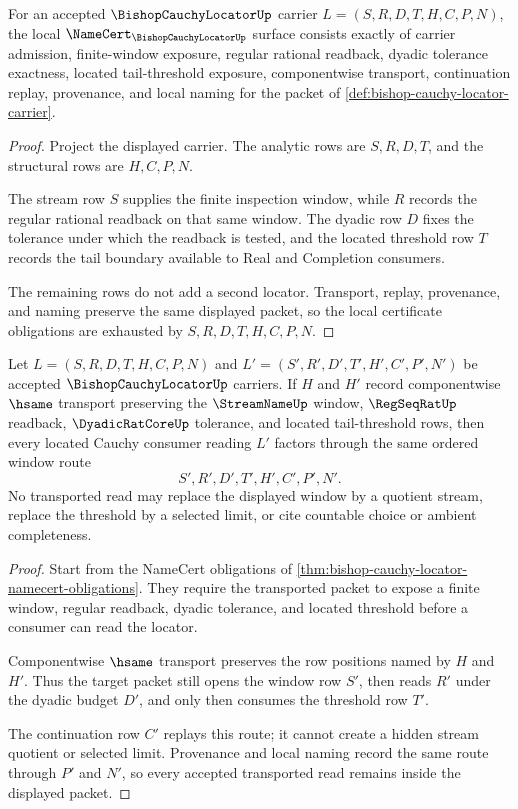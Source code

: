 \begin{theorem}
\label{thm:bishop-cauchy-locator-namecert-obligations}
For an accepted $\BishopCauchyLocatorUp$ carrier $L=(S,R,D,T,H,C,P,N)$, the local $\NameCert_{\BishopCauchyLocatorUp}$ surface consists exactly of carrier admission, finite-window exposure, regular rational readback, dyadic tolerance exactness, located tail-threshold exposure, componentwise transport, continuation replay, provenance, and local naming for the packet of \autoref{def:bishop-cauchy-locator-carrier}.
\end{theorem}
\begin{proof}
Project the displayed carrier. The analytic rows are $S,R,D,T$, and the structural rows are $H,C,P,N$.

The stream row $S$ supplies the finite inspection window, while $R$ records the regular rational readback on that same window. The dyadic row $D$ fixes the tolerance under which the readback is tested, and the located threshold row $T$ records the tail boundary available to Real and Completion consumers.

The remaining rows do not add a second locator. Transport, replay, provenance, and naming preserve the same displayed packet, so the local certificate obligations are exhausted by $S,R,D,T,H,C,P,N$.
\end{proof}

\begin{theorem}
\label{thm:bishop-cauchy-locator-window-stability}
Let $L=(S,R,D,T,H,C,P,N)$ and $L'=(S',R',D',T',H',C',P',N')$ be accepted $\BishopCauchyLocatorUp$ carriers. If $H$ and $H'$ record componentwise $\hsame$ transport preserving the $\StreamNameUp$ window, $\RegSeqRatUp$ readback, $\DyadicRatCoreUp$ tolerance, and located tail-threshold rows, then every located Cauchy consumer reading $L'$ factors through the same ordered window route
$$
S',R',D',T',H',C',P',N'.
$$
No transported read may replace the displayed window by a quotient stream, replace the threshold by a selected limit, or cite countable choice or ambient completeness.
\end{theorem}
\begin{proof}
Start from the NameCert obligations of \autoref{thm:bishop-cauchy-locator-namecert-obligations}. They require the transported packet to expose a finite window, regular readback, dyadic tolerance, and located threshold before a consumer can read the locator.

Componentwise $\hsame$ transport preserves the row positions named by $H$ and $H'$. Thus the target packet still opens the window row $S'$, then reads $R'$ under the dyadic budget $D'$, and only then consumes the threshold row $T'$.

The continuation row $C'$ replays this route; it cannot create a hidden stream quotient or selected limit. Provenance and local naming record the same route through $P'$ and $N'$, so every accepted transported read remains inside the displayed packet.
\end{proof}

